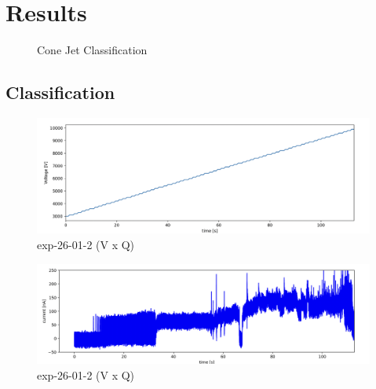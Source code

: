 \chapter{Results}
\label{chap:Results}

\begin{figure}[H]
    \centering
    \caption{Cone Jet Classification}
    \label{fig:multi_class_exp}
\end{figure}


\section{Classification}
\label{sec:classification_results}


\begin{figure}[H]
    \center
    \includegraphics[width=12cm]{Figuras/19:03/voltage_step.png}
    \caption{ exp-26-01-2 (V x Q)}
\end{figure}


\begin{figure}[H]
    \center
    \includegraphics[width=12cm]{Figuras/19:03/raw-data-example.png}
    \caption{ exp-26-01-2 (V x Q)}
\end{figure}


